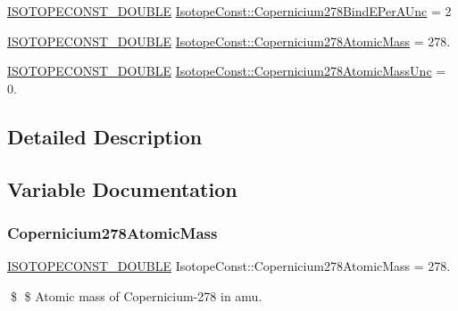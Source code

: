 \begin{DoxyCompactItemize}
\item 
\mbox{\hyperlink{group___isotope_const-_macros_ga8f45a7272ce02c0b4c65c44636ed719a}{I\+S\+O\+T\+O\+P\+E\+C\+O\+N\+S\+T\+\_\+\+D\+O\+U\+B\+LE}} \mbox{\hyperlink{group___isotope_const-_copernicium-_cn278_ga5a913debf6758a073d37a71a7ae9c5e5}{Isotope\+Const\+::\+Copernicium278\+Bind\+E\+Per\+A\+Unc}} = 2
\item 
\mbox{\hyperlink{group___isotope_const-_macros_ga8f45a7272ce02c0b4c65c44636ed719a}{I\+S\+O\+T\+O\+P\+E\+C\+O\+N\+S\+T\+\_\+\+D\+O\+U\+B\+LE}} \mbox{\hyperlink{group___isotope_const-_copernicium-_cn278_gace90bb6834884f5f2a1633fa456c7665}{Isotope\+Const\+::\+Copernicium278\+Atomic\+Mass}} = 278.
\item 
\mbox{\hyperlink{group___isotope_const-_macros_ga8f45a7272ce02c0b4c65c44636ed719a}{I\+S\+O\+T\+O\+P\+E\+C\+O\+N\+S\+T\+\_\+\+D\+O\+U\+B\+LE}} \mbox{\hyperlink{group___isotope_const-_copernicium-_cn278_ga6b44cf1d0641216ac6ab9e3e2692db57}{Isotope\+Const\+::\+Copernicium278\+Atomic\+Mass\+Unc}} = 0.
\end{DoxyCompactItemize}


\subsection{Detailed Description}


\subsection{Variable Documentation}
\mbox{\label{group___isotope_const-_copernicium-_cn278_gace90bb6834884f5f2a1633fa456c7665}} 
\subsubsection{\texorpdfstring{Copernicium278\+Atomic\+Mass}{Copernicium278AtomicMass}}
{\footnotesize\ttfamily \mbox{\hyperlink{group___isotope_const-_macros_ga8f45a7272ce02c0b4c65c44636ed719a}{I\+S\+O\+T\+O\+P\+E\+C\+O\+N\+S\+T\+\_\+\+D\+O\+U\+B\+LE}} Isotope\+Const\+::\+Copernicium278\+Atomic\+Mass = 278.}

\$ \$ Atomic mass of Copernicium-\/278 in amu. \mbox{\label{group___isotope_const-_copernicium-_cn278_ga6b44cf1d0641216ac6ab9e3e2692db57}} 
